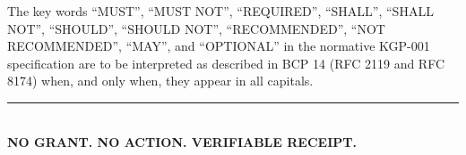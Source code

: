 \documentclass[10.5pt,a4paper]{article}
\begin{document}
The key words ``MUST'', ``MUST NOT'', ``REQUIRED'', ``SHALL'', ``SHALL NOT'', ``SHOULD'',
``SHOULD NOT'', ``RECOMMENDED'', ``NOT RECOMMENDED'', ``MAY'', and ``OPTIONAL'' in the
normative KGP-001 specification are to be interpreted as described in BCP 14 (RFC 2119 and
RFC 8174) when, and only when, they appear in all capitals.

\vfill
\begin{center}
\rule{0.28\linewidth}{0.5pt}\\[4pt]
{\sffamily\bfseries NO GRANT. NO ACTION. VERIFIABLE RECEIPT.}
\end{center}
\end{document}

